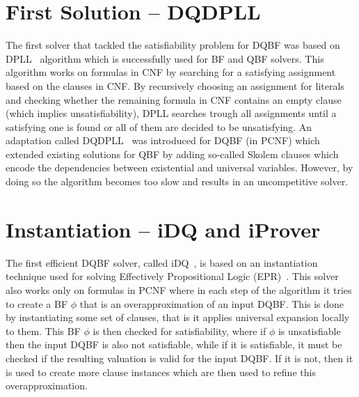 \documentclass[
  digital, %
  twoside, %
  table,   %
  nolof,     %
  nolot,     %
]{fithesis3}
\theoremstyle{definition}
\theoremstyle{remark}
\begin{document}

\section{First Solution -- DQDPLL}
The first solver that tackled the satisfiability problem for DQBF was based on DPLL~\cite{DPLL} algorithm which is successfully used for BF and QBF solvers. This algorithm works on formulas in CNF by searching for a satisfying assignment based on the clauses in CNF. By recursively choosing an assignment for literals and checking whether the remaining formula in CNF contains an empty clause (which implies unsatisfiability), DPLL searches trough all assignments until a satisfying one is found or all of them are decided to be unsatisfying. An adaptation called DQDPLL~\cite{DPLLalgorithm} was introduced for DQBF (in PCNF) which extended existing solutions for QBF by adding so-called Skolem clauses which encode the dependencies between existential and universal variables. However, by doing so the algorithm becomes too slow and results in an uncompetitive solver.

\section{Instantiation -- iDQ and iProver}
The first efficient DQBF solver, called iDQ~\cite{iDQandDQDIMACS}, is based on an instantiation technique used for solving Effectively Propositional Logic (EPR)~\cite{iProver}. This solver also works only on formulas in PCNF where in each step of the algorithm it tries to create a BF $\phi$ that is an overapproximation of an input DQBF. This is done by instantiating some set of clauses, that is it applies universal expansion locally to them. This BF $\phi$ is then checked for satisfiability, where if $\phi$ is unsatisfiable then the input DQBF is also not satisfiable, while if it is satisfiable, it must be checked if the resulting valuation is valid for the input DQBF. If it is not, then it is used to create more clause instances which are then used to refine this overapproximation.
\end{document}
